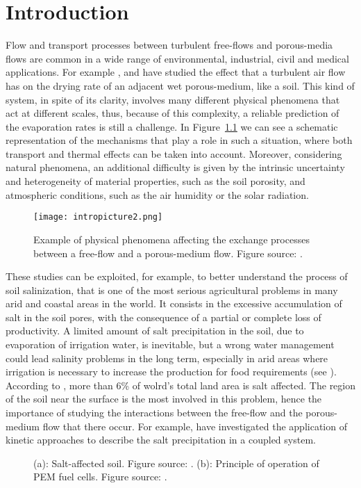 \chapter{Introduction}
Flow and transport processes between turbulent free-flows and porous-media 
flows are common in a wide range of environmental, industrial, civil and medical 
applications.
For example \textcite{tesi:mosthaf}, \textcite{intro:davarzani} and \textcite  {tesi:fetzer} have studied the effect that a turbulent air flow has on the 
drying rate of an adjacent wet porous-medium, like a soil. This kind of system, 
in spite of its clarity, involves many different physical phenomena that act at 
different scales, thus, because of this complexity, a reliable prediction of 
the evaporation rates is still a challenge. In Figure~\ref{fig:intro} we can 
see a schematic representation of the mechanisms that play a role in such a 
situation, where both transport and thermal effects can be taken into account. 
Moreover, considering natural phenomena, an additional difficulty is given by 
the intrinsic uncertainty and heterogeneity of material properties, such as the 
soil porosity, and atmospheric conditions, such as the air humidity or the 
solar radiation.
\begin{figure}[ht]
	\centering
	\texttt{[image: intropicture2.png]}
	\caption[Exchange processes between free and porous-medium 
	flows]{Example of physical phenomena affecting the exchange processes 
		between a free-flow and a porous-medium flow. Figure source: 
		\cite{tesi:fetzer}.}
	\label{fig:intro}
\end{figure}

These studies can be exploited, for example, to better understand the process of soil salinization, that is one of the most serious agricultural problems in many arid and coastal areas in the world. It consists in the excessive accumulation of salt in the soil pores, with the consequence of a partial or complete loss of productivity. A limited amount of salt precipitation in the soil, due to evaporation of irrigation water, is inevitable, but a wrong water management could lead salinity problems in the long term, especially in arid areas where irrigation is necessary to increase the production for food requirements (see \cite{web:fao}). According to \cite{soil:munns}, more than 6\% of wolrd's total land area is salt affected.
The region of the soil near the surface is the most involved in this problem, hence the importance of studying the interactions between the free-flow and the porous-medium flow that there occur. For example, \textcite{intro:salinization} have investigated the application of kinetic approaches to describe the salt precipitation in a coupled system.
\begin{figure}
	\centering
	\caption{(a): Salt-affected soil. Figure source: \cite{web:fao}. (b): Principle of operation of PEM fuel cells. Figure source: \cite{intro:pemfig}.}
	\label{fig:intro2}
\end{figure}

